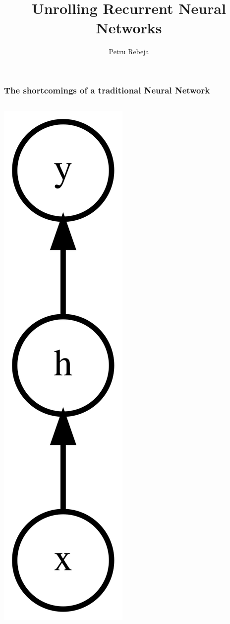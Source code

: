 \documentclass{beamer}
\title{Unrolling Recurrent Neural Networks}
\author{Petru Rebeja}
\begin{document}
\maketitle
\begin{frame}
  \frametitle{The shortcomings of a traditional Neural Network \cite{rnn-efectiveness}}
  \begin{columns}
    \begin{column}{0.3\textwidth}
      \begin{center}
        \includegraphics[height=0.6\textheight]{../img/traditional-nn.png}

\end{center}
\end{column}
\end{columns}
\end{frame}
\end{document}

